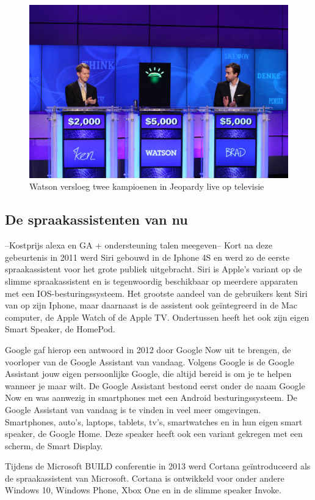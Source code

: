\begin{figure}[h]
    \includegraphics[width=0.7\linewidth]{img/WatsonJeopardy}
    \caption{Watson versloeg twee kampioenen in Jeopardy live op televisie \autocite{Markoff2011}}
    \label{fig:watson}
\end{figure}

\subsection{De spraakassistenten van nu}
--Kostprijs alexa en GA + ondersteuning talen meegeven--
Kort na deze gebeurtenis in 2011 werd Siri gebouwd in de Iphone 4S en werd zo de eerste spraakassistent voor het grote publiek uitgebracht. Siri is Apple's variant op de slimme spraakassistent en is tegenwoordig beschikbaar op meerdere apparaten met een IOS-besturingssysteem. Het grootste aandeel van de gebruikers kent Siri van op zijn Iphone, maar daarnaast is de assistent ook geïntegreerd in de Mac computer, de Apple Watch of de Apple TV. Ondertussen heeft het ook zijn eigen Smart Speaker, de HomePod.

Google gaf hierop een antwoord in 2012 door Google Now uit te brengen, de voorloper van de Google Assistant van vandaag. Volgens Google is de Google Assistant jouw eigen persoonlijke Google, die altijd bereid is om je te helpen wanneer je maar wilt. De Google Assistant bestond eerst onder de naam Google Now en was aanwezig in smartphones met een Android besturingssysteem. De Google Assistant van vandaag is te vinden in veel meer omgevingen. Smartphones, auto's, laptops, tablets, tv's, smartwatches en in hun eigen smart speaker, de Google Home. Deze speaker heeft ook een variant gekregen met een scherm, de Smart Display.

Tijdens de Microsoft BUILD conferentie in 2013 werd Cortana geïntroduceerd als de spraakassistent van Microsoft. Cortana is ontwikkeld voor onder andere Windows 10, Windows Phone, Xbox One en in de slimme speaker Invoke.

